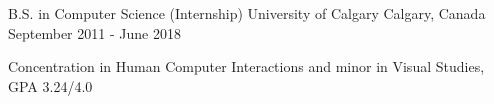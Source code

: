 \begin{cventries}
  \cventry
    {B.S. in Computer Science (Internship)}
    {University of Calgary}
    {Calgary, Canada}
    {September 2011 - June 2018}
    {
      \begin{cvitems}
      \item {Concentration in Human Computer Interactions and minor in Visual Studies, GPA 3.24/4.0}
      \end{cvitems}
    }
\end{cventries}
